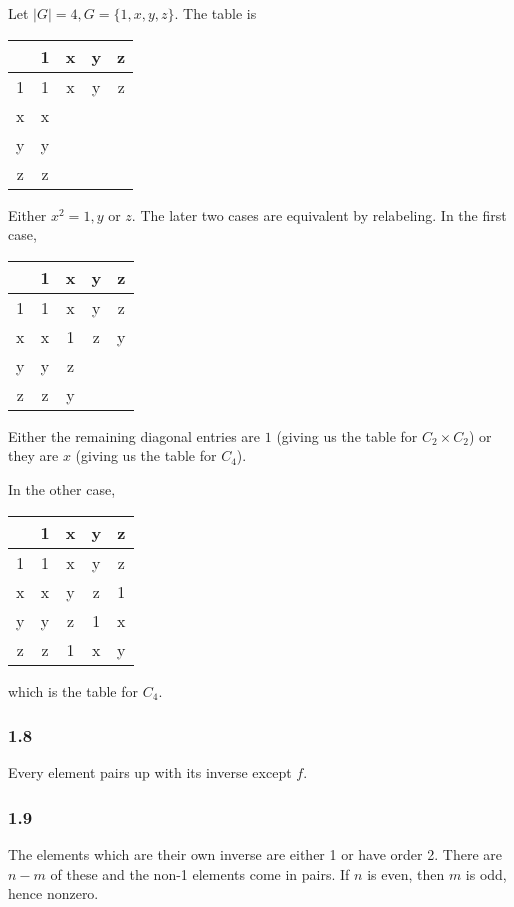 \documentclass{article}
\begin{document}
Let $|G| = 4, G = \{1, x, y, z\}$. The table is

\begin{tabular}{ c | c | c | c | c }
    & 1 & x & y & z \\ \hline
  1 & 1 & x & y & z \\ \hline
  x & x &   &   &   \\ \hline
  y & y &   &   &   \\ \hline
  z & z &   &   &
\end{tabular}

Either $x^2 = 1, y$ or $z$. The later two cases are equivalent by relabeling. In the first case,

\begin{tabular}{ c | c | c | c | c }
    & 1 & x & y & z \\ \hline
  1 & 1 & x & y & z \\ \hline
  x & x & 1 & z & y \\ \hline
  y & y & z &   &   \\ \hline
  z & z & y &   &
\end{tabular}

Either the remaining diagonal entries are $1$ (giving us the table for $C_2 \times C_2$) or they are $x$ (giving us the table for $C_4$).

In the other case,

\begin{tabular}{ c | c | c | c | c }
    & 1 & x & y & z \\ \hline
  1 & 1 & x & y & z \\ \hline
  x & x & y & z & 1 \\ \hline
  y & y & z & 1 & x \\ \hline
  z & z & 1 & x & y
\end{tabular}

which is the table for $C_4$.

\subsubsection*{1.8}

Every element pairs up with its inverse except $f$.

\subsubsection*{1.9}

The elements which are their own inverse are either 1 or have order 2. There are $n-m$ of these and the non-1 elements come in pairs. If $n$ is even, then $m$ is odd, hence nonzero.
\end{document}
